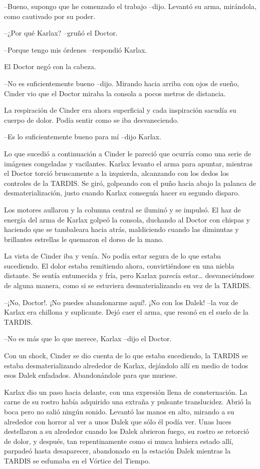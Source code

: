 --Bueno, supongo que he comenzado el trabajo --dijo. Levantó su arma, mirándola, como cautivado por su poder.

--¿Por qué Karlax? --gruñó el Doctor.

--Porque tengo mis órdenes --respondió Karlax.

El Doctor negó con la cabeza. 

--No es suficientemente bueno --dijo. Mirando hacia arriba con ojos de sueño, Cinder vio que el Doctor miraba la consola a pocos metros de distancia.

La respiración de Cinder era ahora superficial y cada inspiración sacudía su cuerpo de dolor. Podía sentir como se iba desvaneciendo.

--Es lo suficientemente bueno para mí --dijo Karlax.

Lo que sucedió a continuación a Cinder le pareció que ocurría como una serie de imágenes congeladas y vacilantes. Karlax levanto el arma para apuntar, mientras el Doctor torció bruscamente a la izquierda, alcanzando con los dedos los controles de la TARDIS. Se giró, golpeando con el puño hacia abajo la palanca de desmaterialización, justo cuando Karlax conseguía  hacer su segundo disparo.

Los motores aullaron y la columna central se iluminó y se impulsó. El haz de energía del arma de Karlax golpeó la consola, duchando al Doctor con chispas y haciendo que se tambaleara hacia atrás, maldiciendo cuando las diminutas y brillantes estrellas le quemaron el dorso de la mano.

La vista de Cinder iba y venía. No podía estar segura de lo que estaba sucediendo. El dolor estaba remitiendo ahora, convirtiéndose en una niebla distante. Se sentía entumecida y fría, pero Karlax parecía estar… desvaneciéndose de alguna manera, como si se estuviera desmaterializando en vez de la TARDIS.

--¡No, Doctor!. ¡No puedes abandonarme aquí!. ¡No con los Dalek! --la voz de Karlax era chillona y suplicante. Dejó caer el arma, que resonó en el suelo de la TARDIS.

--No es más que lo que merece, Karlax --dijo el Doctor.

Con un shock, Cinder se dio cuenta de lo que estaba sucediendo, la TARDIS se estaba desmaterializando alrededor de Karlax, dejándolo allí en medio de todos esos Dalek enfadados. Abandonándole para que muriese.

Karlax dio un paso hacia delante, con una expresión llena de consternación. La carne de su rostro había adquirido una extraña y pulsante translucidez. Abrió la boca pero no salió ningún sonido. Levantó las manos en alto, mirando a su alrededor con horror al ver a unos Dalek que sólo él podía ver. Unas luces destellaron a su alrededor cuando los Dalek abrieron fuego, su rostro se retorció de dolor, y después, tan repentinamente como si nunca hubiera estado allí, parpadeó hasta desaparecer, abandonado en la estación Dalek mientras la TARDIS se esfumaba en el Vórtice del Tiempo.

